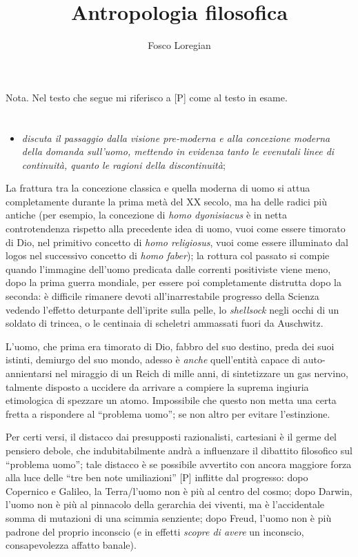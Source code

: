 \documentclass[dvipsnames]{amsart}
\title{Antropologia filosofica}
\author{Fosco Loregian}
\begin{document}
\maketitle 
{\sc Nota.} Nel testo che segue mi riferisco a [P] come al testo in esame.
\section{}
\begin{itemize}
  \item \emph{discuta il passaggio dalla visione pre-moderna e alla concezione moderna della domanda sull'uomo, mettendo in evidenza tanto le evenutali linee di continuità, quanto le ragioni della discontinuità};
\end{itemize}
La frattura tra la concezione classica e quella moderna di uomo si attua completamente durante la prima metà del XX secolo, ma ha delle radici più antiche (per esempio, la concezione di \emph{homo dyonisiacus} è in netta controtendenza rispetto alla precedente idea di uomo, vuoi come essere timorato di Dio, nel primitivo concetto di \emph{homo religiosus}, vuoi come essere illuminato dal logos nel successivo concetto di \emph{homo faber}); la rottura col passato si compie quando l'immagine dell'uomo predicata dalle correnti positiviste viene meno, dopo la prima guerra mondiale, per essere poi completamente distrutta dopo la seconda: è difficile rimanere devoti all'inarrestabile progresso della Scienza vedendo l'effetto deturpante dell'iprite sulla pelle, lo \emph{shellsock} negli occhi di un soldato di trincea, o le centinaia di scheletri ammassati fuori da Auschwitz. 

L'uomo, che prima era timorato di Dio, fabbro del suo destino, preda dei suoi istinti, demiurgo del suo mondo, adesso è \emph{anche} quell'entità capace di auto-annientarsi nel miraggio di un Reich di mille anni, di sintetizzare un gas nervino, talmente disposto a uccidere da arrivare a compiere la suprema ingiuria etimologica di spezzare un atomo. Impossibile che questo non metta una certa fretta a rispondere al ``problema uomo''; se non altro per evitare l'estinzione.

Per certi versi, il distacco dai presupposti razionalisti, cartesiani è il germe del pensiero debole, che indubitabilmente andrà a influenzare il dibattito filosofico sul ``problema uomo''; tale distacco è se possibile avvertito con ancora maggiore forza alla luce delle ``tre ben note umiliazioni'' [P] inflitte dal progresso: dopo Copernico e Galileo, la Terra\fshyp{}l'uomo non è più al centro del cosmo; dopo Darwin, l'uomo non è più al pinnacolo della gerarchia dei viventi, ma è l'accidentale somma di mutazioni di una scimmia senziente; dopo Freud, l'uomo non è più padrone del proprio inconscio (e in effetti \emph{scopre di avere} un inconscio, consapevolezza affatto banale). 
\end{document}
